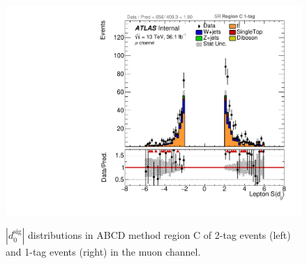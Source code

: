 \begin{figure}[!htbp]
\begin{center}
\includegraphics[scale=0.33]{./figures/boosted/ABCD/muon_SR_RegionC_1tag_Lep_d0sigL}   \\
\caption{$|d_{0}^{\textrm{sig}}|$ distributions in ABCD method region C of 2-tag events (left) and 1-tag events (right) in the muon channel.}
\label{fig:boosted_abcd_region_c_SR_muon_d0}
\end{center}
\end{figure}

